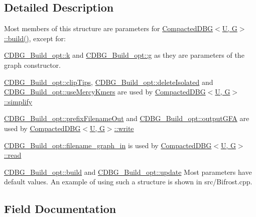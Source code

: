 \subsection{Detailed Description}
Most members of this structure are parameters for \hyperlink{classCompactedDBG_a6021ad2fe7b11998b886bc5fd9e1a4ba}{Compacted\+D\+B\+G$<$\+U, G$>$\+::build()}, except for\+: 


\begin{DoxyItemize}
\item \hyperlink{structCDBG__Build__opt_af59eb333394387f84dcf35ab740bd482}{C\+D\+B\+G\+\_\+\+Build\+\_\+opt\+::k} and \hyperlink{structCDBG__Build__opt_ab8d8ec72715094561d247b45ed5887f0}{C\+D\+B\+G\+\_\+\+Build\+\_\+opt\+::g} as they are parameters of the graph constructor.
\item \hyperlink{structCDBG__Build__opt_a7e916ec6f4674bf1239b64da22bac9ee}{C\+D\+B\+G\+\_\+\+Build\+\_\+opt\+::clip\+Tips}, \hyperlink{structCDBG__Build__opt_ae5c727e6d5b10764d03556f570ab5f5d}{C\+D\+B\+G\+\_\+\+Build\+\_\+opt\+::delete\+Isolated} and \hyperlink{structCDBG__Build__opt_a6986d2570dc42f602b4ed884ff5b9084}{C\+D\+B\+G\+\_\+\+Build\+\_\+opt\+::use\+Mercy\+Kmers} are used by \hyperlink{classCompactedDBG_aa8c574863bed96d2a9415cbe3d154de6}{Compacted\+D\+B\+G$<$\+U, G$>$\+::simplify}
\item \hyperlink{structCDBG__Build__opt_a65f1dfdab74608283293c69e4bad60ba}{C\+D\+B\+G\+\_\+\+Build\+\_\+opt\+::prefix\+Filename\+Out} and \hyperlink{structCDBG__Build__opt_a59256092145b2e12068a0874e3bffa94}{C\+D\+B\+G\+\_\+\+Build\+\_\+opt\+::output\+G\+FA} are used by \hyperlink{classCompactedDBG_a15707e8624006d247e58e4c67718a677}{Compacted\+D\+B\+G$<$\+U, G$>$\+::write}
\item \hyperlink{structCDBG__Build__opt_a121574067fffe9fa3c0c280ec633ffc3}{C\+D\+B\+G\+\_\+\+Build\+\_\+opt\+::filename\+\_\+graph\+\_\+in} is used by \hyperlink{classCompactedDBG_a0930cb63a158caa70f4dcd425a088fb4}{Compacted\+D\+B\+G$<$\+U, G$>$\+::read}
\item \hyperlink{structCDBG__Build__opt_af2d14fa2147c3353d545a3ab970b683e}{C\+D\+B\+G\+\_\+\+Build\+\_\+opt\+::build} and \hyperlink{structCDBG__Build__opt_a19fd0874dfc472a56d5c7bf375d849e8}{C\+D\+B\+G\+\_\+\+Build\+\_\+opt\+::update} Most parameters have default values. An example of using such a structure is shown in src/\+Bifrost.\+cpp. 
\end{DoxyItemize}

\subsection{Field Documentation}
\mbox{\label{structCDBG__Build__opt_af2d14fa2147c3353d545a3ab970b683e}} 
